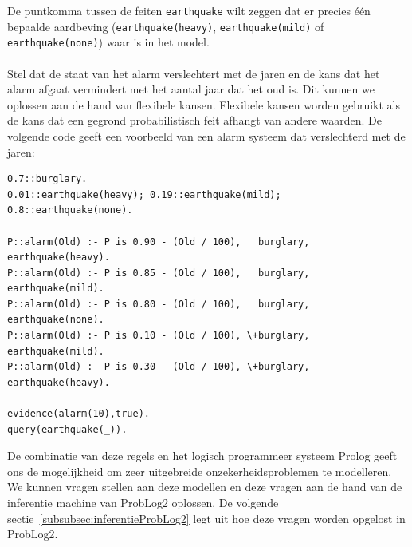 \documentclass[12pt,a4paper,oneside]{book}
\theoremstyle{definition}
\begin{document}
De puntkomma tussen de feiten \texttt{earthquake} wilt zeggen dat er precies \'{e}\'{e}n bepaalde aardbeving (\texttt{earthquake(heavy)}, \texttt{earthquake(mild)} of \texttt{earthquake(none)}) waar is in het model.
\\\\
Stel dat de staat van het alarm verslechtert met de jaren en de kans dat het alarm afgaat vermindert met het aantal jaar dat het oud is. Dit kunnen we oplossen aan de hand van flexibele kansen. Flexibele kansen worden gebruikt als de kans dat een gegrond probabilistisch feit afhangt van andere waarden. De volgende code geeft een voorbeeld van een alarm systeem dat verslechterd met de jaren:
\begin{verbatim}
0.7::burglary.
0.01::earthquake(heavy); 0.19::earthquake(mild); 0.8::earthquake(none).

P::alarm(Old) :- P is 0.90 - (Old / 100),   burglary, earthquake(heavy).
P::alarm(Old) :- P is 0.85 - (Old / 100),   burglary, earthquake(mild).
P::alarm(Old) :- P is 0.80 - (Old / 100),   burglary, earthquake(none).
P::alarm(Old) :- P is 0.10 - (Old / 100), \+burglary, earthquake(mild).
P::alarm(Old) :- P is 0.30 - (Old / 100), \+burglary, earthquake(heavy).

evidence(alarm(10),true).
query(earthquake(_)).
\end{verbatim}
De combinatie van deze regels en het logisch programmeer systeem Prolog geeft ons de mogelijkheid om zeer uitgebreide onzekerheidsproblemen te modelleren. We kunnen vragen stellen aan deze modellen en deze vragen aan de hand van de inferentie machine van ProbLog2 oplossen. De volgende sectie~\ref{subsubsec:inferentieProbLog2} legt uit hoe deze vragen worden opgelost in ProbLog2.
\end{document}

